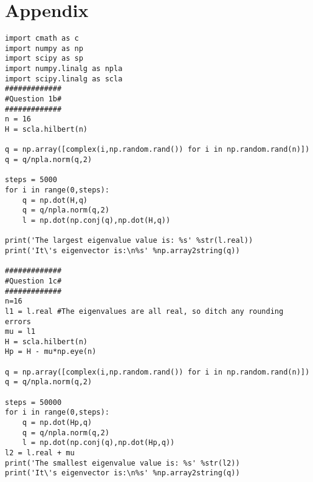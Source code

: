 \documentclass[10pt,a4paper]{article}
\begin{document}
\section{Appendix}
\begin{verbatim}
import cmath as c
import numpy as np
import scipy as sp
import numpy.linalg as npla
import scipy.linalg as scla
#############
#Question 1b#
#############
n = 16
H = scla.hilbert(n)

q = np.array([complex(i,np.random.rand()) for i in np.random.rand(n)])
q = q/npla.norm(q,2)

steps = 5000
for i in range(0,steps):
    q = np.dot(H,q)
    q = q/npla.norm(q,2)
    l = np.dot(np.conj(q),np.dot(H,q))

print('The largest eigenvalue value is: %s' %str(l.real))
print('It\'s eigenvector is:\n%s' %np.array2string(q))

#############
#Question 1c#
#############
n=16
l1 = l.real #The eigenvalues are all real, so ditch any rounding errors
mu = l1
H = scla.hilbert(n)
Hp = H - mu*np.eye(n)

q = np.array([complex(i,np.random.rand()) for i in np.random.rand(n)])
q = q/npla.norm(q,2)

steps = 50000
for i in range(0,steps):
    q = np.dot(Hp,q)
    q = q/npla.norm(q,2)
    l = np.dot(np.conj(q),np.dot(Hp,q))
l2 = l.real + mu
print('The smallest eigenvalue value is: %s' %str(l2))
print('It\'s eigenvector is:\n%s' %np.array2string(q))
\end{verbatim}
\end{document}
